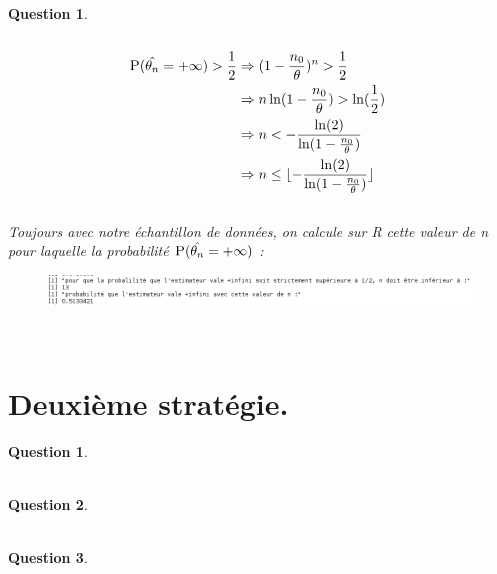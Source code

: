\documentclass[a4paper,11pt]{article}
\newtheorem{exo1}{Question}
\newtheorem{exo2}{Question}
\begin{document}
\begin{exo1} \ \\ \\
\begin{equation}
\begin{aligned}
\textsc{P}(\hat{\theta_{n}}=+\infty) > \frac{1}{2} & \Rightarrow (1-\frac{n_{0}}{\theta})^{n} > \frac{1}{2} \ \\
& \Rightarrow n\ln(1-\frac{n_{0}}{\theta}) > \ln(\frac{1}{2}) \ \\
& \Rightarrow n < -\frac{\ln(2)}{\ln(1-\frac{n_{0}}{\theta})} \ \\
& \Rightarrow n \leq \lfloor-\frac{\ln(2)}{\ln(1-\frac{n_{0}}{\theta})}\rfloor
\end{aligned}
\end{equation} \ \\
Toujours avec notre échantillon de données, on calcule sur R cette valeur de n pour laquelle la probabilité $\textsc{P}(\hat{\theta_{n}}=+\infty)$ :
\begin{figure}[h]
\includegraphics[scale=0.5]{images/Q1_6.png}
\end{figure} \ \\
\end{exo1}

\newpage

\section{Deuxième stratégie.}

\begin{exo2} \ \\ \\

\end{exo2}

\begin{exo2} \ \\ \\

\end{exo2}

\begin{exo2} \ \\ \\

\end{exo2}
\end{document}
